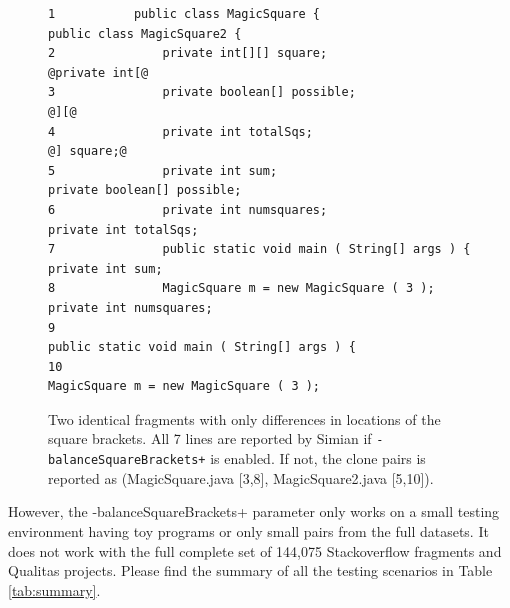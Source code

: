 \documentclass{IEEEtran}
\begin{document}
\noindent\begin{figure}[H]
	\scriptsize
	\begin{lstlisting}[frame=single,style=base]
1           public class MagicSquare {                             public class MagicSquare2 {
2               private int[][] square;                                @private int[@
3               private boolean[] possible;                                        @][@
4               private int totalSqs;                                              @] square;@
5               private int sum;                                       private boolean[] possible;
6               private int numsquares;                                private int totalSqs;
7               public static void main ( String[] args ) {            private int sum;
8               MagicSquare m = new MagicSquare ( 3 );                 private int numsquares;
9                                                                      public static void main ( String[] args ) {
10                                                                     MagicSquare m = new MagicSquare ( 3 );
	\end{lstlisting}
	\caption{Two identical fragments with only differences in locations of the square brackets. All 7 lines are reported by Simian if \small\texttt{-balanceSquareBrackets+} \normalsize is enabled. If not, the clone pairs is reported as \newline (MagicSquare.java [3,8], MagicSquare2.java [5,10]).} 
	\label{fig:two_frags}
\end{figure}

However, the -balanceSquareBrackets+ parameter only works on a small testing environment having toy programs or only small pairs from the full datasets. It does not work with the full complete set of 144,075 Stackoverflow fragments and Qualitas projects. Please find the summary of all the testing scenarios in Table \ref{tab:summary}. %
\end{document}
